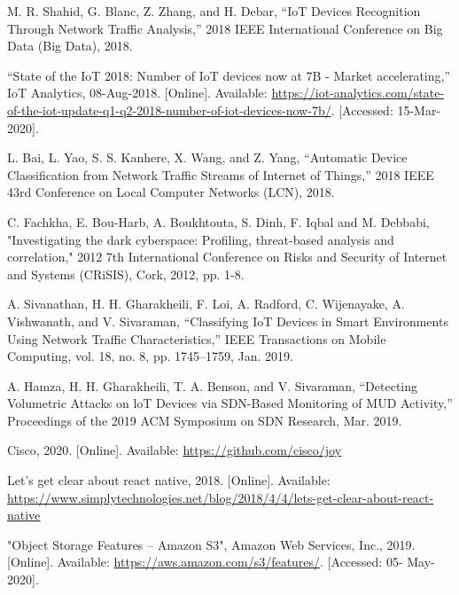 \documentclass{article}
\begin{document}
\begin{thebibliography}{35} 

M. R. Shahid, G. Blanc, Z. Zhang, and H. Debar, “IoT Devices Recognition Through Network Traffic Analysis,” 2018 IEEE International Conference on Big Data (Big Data), 2018.

 “State of the IoT 2018: Number of IoT devices now at 7B - Market accelerating,” IoT Analytics, 08-Aug-2018. [Online]. Available: \url{https://iot-analytics.com/state-of-the-iot-update-q1-q2-2018-number-of-iot-devices-now-7b/}. [Accessed: 15-Mar-2020].

L. Bai, L. Yao, S. S. Kanhere, X. Wang, and Z. Yang, “Automatic Device Classification from Network Traffic Streams of Internet of Things,” 2018 IEEE 43rd Conference on Local Computer Networks (LCN), 2018.

 C. Fachkha, E. Bou-Harb, A. Boukhtouta, S. Dinh, F. Iqbal and M. Debbabi,
"Investigating the dark cyberspace: Profiling, threat-based analysis and correlation," 2012
7th International Conference on Risks and Security of Internet and Systems (CRiSIS),
Cork, 2012, pp. 1-8.

 A. Sivanathan, H. H. Gharakheili, F. Loi, A. Radford, C. Wijenayake, A. Vishwanath, and V. Sivaraman, “Classifying IoT Devices in Smart Environments Using Network Traffic Characteristics,” IEEE Transactions on Mobile Computing, vol. 18, no. 8, pp. 1745–1759, Jan. 2019.

 A. Hamza, H. H. Gharakheili, T. A. Benson, and V. Sivaraman, “Detecting Volumetric Attacks on loT Devices via SDN-Based Monitoring of MUD Activity,” Proceedings of the 2019 ACM Symposium on SDN Research, Mar. 2019.

 Cisco, 2020. [Online]. Available: \url{https://github.com/cisco/joy}

 Let’s get clear about react native, 2018. [Online]. Available: \url{https://www.simplytechnologies.net/blog/2018/4/4/lets-get-clear-about-react-native}

 "Object Storage Features – Amazon S3", Amazon Web Services, Inc., 2019. 
[Online]. Available: \url{https://aws.amazon.com/s3/features/}. [Accessed: 05- May- 2020].


\end{thebibliography}
\end{document}
